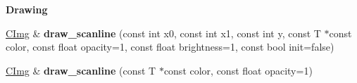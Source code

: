 \begin{Indent}{\bf Drawing}\par
{\em \label{_amgrp681d72abce5de4f856e71bfb1856796b}
 }\begin{DoxyCompactItemize}
\item 
\hypertarget{structcimg__library_1_1_c_img_acd3f9022a6d5f79aea2118d8d4323759}{
\hyperlink{structcimg__library_1_1_c_img}{CImg} \& {\bfseries draw\_\-scanline} (const int x0, const int x1, const int y, const T $\ast$const color, const float opacity=1, const float brightness=1, const bool init=false)}
\label{structcimg__library_1_1_c_img_acd3f9022a6d5f79aea2118d8d4323759}

\item 
\hypertarget{structcimg__library_1_1_c_img_a260a3004536e5daa7d3ccd856f132e7a}{
\hyperlink{structcimg__library_1_1_c_img}{CImg} \& {\bfseries draw\_\-scanline} (const T $\ast$const color, const float opacity=1)}
\label{structcimg__library_1_1_c_img_a260a3004536e5daa7d3ccd856f132e7a}


\end{DoxyCompactItemize}
\end{Indent}
